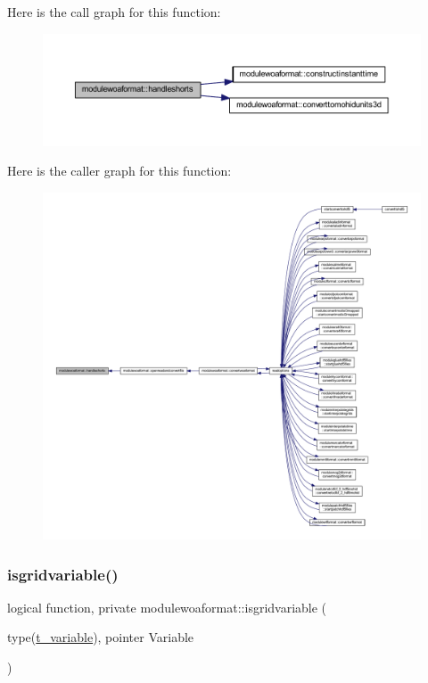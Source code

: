 Here is the call graph for this function\+:\nopagebreak
\begin{figure}[H]
\begin{center}
\leavevmode
\includegraphics[width=350pt]{namespacemodulewoaformat_a42841ad86b89b6a226e5430c17a32293_cgraph}
\end{center}
\end{figure}
Here is the caller graph for this function\+:\nopagebreak
\begin{figure}[H]
\begin{center}
\leavevmode
\includegraphics[width=350pt]{namespacemodulewoaformat_a42841ad86b89b6a226e5430c17a32293_icgraph}
\end{center}
\end{figure}
\mbox{\label{namespacemodulewoaformat_abb1720ff0eef8f5649a76ab7702d73f7}} 
\subsubsection{\texorpdfstring{isgridvariable()}{isgridvariable()}}
{\footnotesize\ttfamily logical function, private modulewoaformat\+::isgridvariable (\begin{DoxyParamCaption}\item[{type(\mbox{\hyperlink{structmodulewoaformat_1_1t__variable}{t\+\_\+variable}}), pointer}]{Variable }\end{DoxyParamCaption})\hspace{0.3cm}{\ttfamily [private]}}

